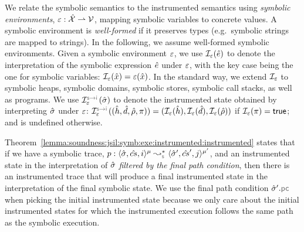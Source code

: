 We relate the symbolic semantics to the instrumented semantics using 
\emph{symbolic environments}, $\varepsilon : \hat{\mathcal{X}} \rightharpoonup \mathcal{V}$, mapping 
symbolic variables to concrete values. 
A symbolic environment is \emph{well-formed} if it preserves types (e.g.~symbolic strings are mapped to strings). In the following, we  
assume well-formed symbolic environments. 
%
Given a symbolic environment $\varepsilon$, we use $\mathcal{I}_\varepsilon(\hat{e})$ to denote the
interpretation of the symbolic expression $\hat{e}$ under $\varepsilon$, with the key case
being the one for symbolic variables: $\mathcal{I}_\varepsilon(\hat{x}) = \varepsilon(\hat{x})$. In the
standard way, we extend
$\mathcal{I}_\varepsilon$ to symbolic heaps, symbolic domains, symbolic stores, symbolic call stacks,
as well as programs. We use $\interpret{\symbinst}{\senv}(\sstate)$ to 
denote the instrumented state obtained by interpreting $\hat{\sigma}$ under $\varepsilon$:
$\interpret{\symbinst}{\senv}((\sheap, \sdom, \sstore, \pc)) = (\shorthand(\sheap), \shorthand(\sdom), \shorthand(\sstore))$ if $\mathcal{I}_\varepsilon(\pi) = {\sf true}$; and is undefined otherwise.

Theorem~\ref{lemma:soundness:jsil:symb:exe:instrumented:instrumented} states 
that if we have a symbolic trace, $\prog : \transabssemrule{\sstate, \scs, i}{\sstate', \scs', j}{\mode}{\mode'}{\symbolic}$,
 and an instrumented state in the interpretation of $\hat{\sigma}$ \emph{filtered by the final 
 path condition}, then there is an instrumented trace that will produce a final instrumented state 
 in the interpretation of the final symbolic state. 
 We use the final path condition $\sstate'.\pcsel$ when picking the initial 
 instrumented state because we only care about the initial instrumented states for which 
the instrumented execution follows the same path as the symbolic execution. 



